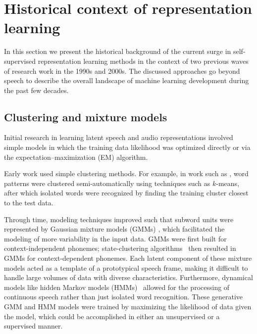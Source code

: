 
\section{Historical context of representation learning}

\label{sec:thirdwave}

In this section we present the historical background of the current surge in
self-supervised representation learning methods in the context of two previous
waves of research work in the 1990s and 2000s. The discussed approaches go
beyond speech to describe the overall landscape of machine learning development during the
past few decades.

\subsection{Clustering and mixture models}

Initial research in learning latent speech and audio representations involved
simple models in which the training data likelihood was optimized directly
or via the expectation--maximization (EM) algorithm.

Early work used simple clustering methods. For example, in work such
as \parencite{rabiner_considerations_1979,wilpon_modified_1985}, word patterns were clustered
semi-automatically using techniques such as $k$-means, after which isolated words
were recognized by finding the training cluster closest to 
  the test data.

Through time, modeling techniques improved such that subword units were
represented by Gaussian mixture models (GMMs) \parencite{gauvain_maximum_1994}, which facilitated
the modeling of more variability in the input data. GMMs were first built for
context-independent phonemes; state-clustering 
algorithms~\parencite{young_state_1994} then resulted in GMMs for context-dependent phonemes. 
Each latent component of these mixture models acted as a template of a
prototypical speech frame, 
making it difficult to handle 
large volumes of data with diverse characteristics. 
Furthermore, dynamical models like hidden Markov models (HMMs)~\parencite{bell_adaptation_2021}
allowed for the processing of continuous speech rather than just isolated word
recognition. These generative GMM and HMM models were trained by maximizing the
likelihood of data given the model, which could be accomplished in either an
unsupervised or a supervised manner.

